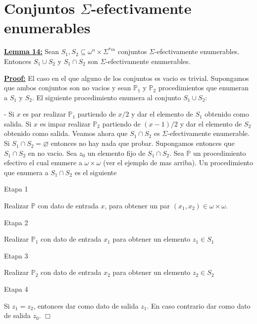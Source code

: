 \section{Conjuntos $\Sigma$-efectivamente enumerables}

  \textbf{\underline{Lemma 14:}} Sean \(S_{1},S_{2}\subseteq \omega ^{n}\times \Sigma ^{\ast m}\) conjuntos \( \Sigma \)-efectivamente enumerables. Entonces \(S_{1}\cup S_{2}\) y \(S_{1}\cap S_{2}\) son \(\Sigma \)-efectivamente enumerables.

  \textbf{\underline{Proof:}} El caso en el que alguno de los conjuntos es vacio es trivial. Supongamos que ambos conjuntos son no vacios y sean \(\mathbb{P}_{1}\) y \(\mathbb{P}_{2}\) procedimientos que enumeran a \(S_{1}\) y \(S_{2}\). El siguiente procedimiento enumera al conjunto \(S_{1}\cup S_{2}\):

- Si \(x\) es par realizar \(\mathbb{P}_{1}\) partiendo de \(x/2\) y dar el elemento de \(S_{1}\) obtenido como salida. Si \(x\) es impar realizar \(\mathbb{P }_{2}\) partiendo de \((x-1)/2\) y dar el elemento de \(S_{2}\) obtenido como salida.
Veamos ahora que \(S_{1}\cap S_{2}\) es \(\Sigma \)-efectivamente enumerable. Si \(S_{1}\cap S_{2}=\varnothing \) entonces no hay nada que probar. Supongamos entonces que \(S_{1}\cap S_{2}\) en no vacio. Sea \(z_{0}\) un elemento fijo de \( S_{1}\cap S_{2}.\) Sea \(\mathbb{P}\) un procedimiento efectivo el cual enumere a \(\omega \times \omega \) (ver el ejemplo de mas arriba). Un procedimiento que enumera a \(S_{1}\cap S_{2}\) es el siguiente

Etapa 1

Realizar \(\mathbb{P}\) con dato de entrada \(x\), para obtener un par \((x_{1},x_{2})\in \omega \times \omega \).

Etapa 2

Realizar \(\mathbb{P}_{1}\) con dato de entrada \(x_{1}\) para obtener un elemento \(z_{1}\in S_{1}\)

Etapa 3

Realizar \(\mathbb{P}_{2}\) con dato de entrada \(x_{2}\) para obtener un elemento \(z_{2}\in S_{2}\)

Etapa 4

Si \(z_{1}=z_{2}\), entonces dar como dato de salida \(z_{1}.\) En caso contrario dar como dato de salida \(z_{0}\). \(\Box\)
